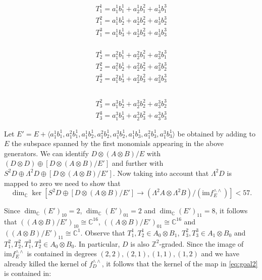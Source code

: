\documentclass[12pt]{amsart}
\theoremstyle{definition}
\theoremstyle{remark}
\theoremstyle{definition}
\newcommand{\CC}{\mathbb{C}}
\begin{document}
\begin{minipage}[t]{.30\textwidth}
     \begin{align*}
T^1_1 = a^1_1b_1^1 + a^1_2b^2_1 + a^1_3b^3_1\\
T^2_1 = a^1_1b^1_2 + a^1_2b^2_2 + a^1_3b^3_2\\
T^3_1 = a^1_1b^1_3 + a^1_2b^2_3 + a^1_3b^3_3\\
\end{align*}
\end{minipage}
\begin{minipage}[t]{.30\textwidth}
\begin{align*}
T^1_2 = a^2_1b^1_1 + a^2_2b^2_1 + a^2_3b^3_1\\
T^2_2 = a^2_1b^1_2 + a^2_2b^2_2 + a^2_3b^3_2\\
T^3_2 = a^2_1b^1_3 + a^2_2b^2_3 + a^2_3b^3_3\\
\end{align*}
\end{minipage}
\begin{minipage}[t]{.30\textwidth}
\begin{align*}
{} \\
T^2_3 = a^3_1b^1_2 + a^3_2b^2_2 + a^3_3b^3_2\\
T^3_3 = a^3_1b^1_3 + a^3_2b^2_3 + a^3_3b^3_3
\end{align*}
\end{minipage}

\noindent
Let $E' = E + \langle a^1_1b_1^1, a^2_1b^1_1, a^1_1b^1_2, a^2_1b^1_2, a^3_1b^1_2, a^1_1b^1_3, a^2_1b^1_3, a^3_1b^1_3\rangle$ be obtained by adding to $E$ the subspace spanned by the first monomials appearing in the above generators. We can identify $D\otimes (A\otimes B)/E$ with $(D\otimes D) \oplus [D\otimes (A\otimes B)/E']$ and further with $S^2 D \oplus \Lambda^2 D \oplus [D\otimes (A\otimes B)/E']$.
Now taking into account that $\Lambda^2 D$ is mapped to zero we need to show that
\begin{equation}\label{eq:goal2}
\dim_\CC \ker [S^2D \oplus [D\otimes (A\otimes B)/E'] \to (\Lambda^2 A \otimes \Lambda^2 B)/(\mathrm{im}f^{\wedge \wedge}_E)] < 57.
\end{equation}

Since $\dim_\CC (E')_{10} = 2$, $\dim_\CC (E')_{01} = 2$ and $\dim_\CC (E')_{11} = 8$, it follows that $((A\otimes B)/E')_{10} \cong \mathbb{C}^{16}$, $((A\otimes B)/E')_{01} \cong \mathbb{C}^{16}$ and $((A\otimes B)/E')_{11} \cong \mathbb{C}^1$. Observe that $T_1^1, T^1_2 \in A_{0}\otimes B_1$, $T^2_3, T^3_3 \in A_1\otimes B_0$ and $T^2_1, T^2_2, T^3_1, T^3_2 \in A_0\otimes B_0$. In particular, $D$ is also $\mathbb{Z}^2$-graded.
Since the image of $\mathrm{im}f^{\wedge \wedge}_E$ is contained in degrees $(2,2), (2,1), (1,1), (1,2)$ and we have already killed the kernel of $f^{\wedge \wedge}_D$, it follows that the kernel of the map in \eqref{eq:goal2} is contained in:
\end{document}

